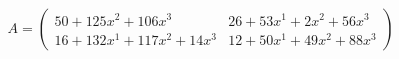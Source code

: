 \documentclass[preview]{standalone}
\begin{document}
\begin{align*}
A = \begin{pmatrix}50 + 125x^{2} + 106x^{3} & 26 + 53x^{1} + 2x^{2} + 56x^{3} \\ 16 + 132x^{1} + 117x^{2} + 14x^{3} & 12 + 50x^{1} + 49x^{2} + 88x^{3}\end{pmatrix}
\end{align*}
\end{document}
